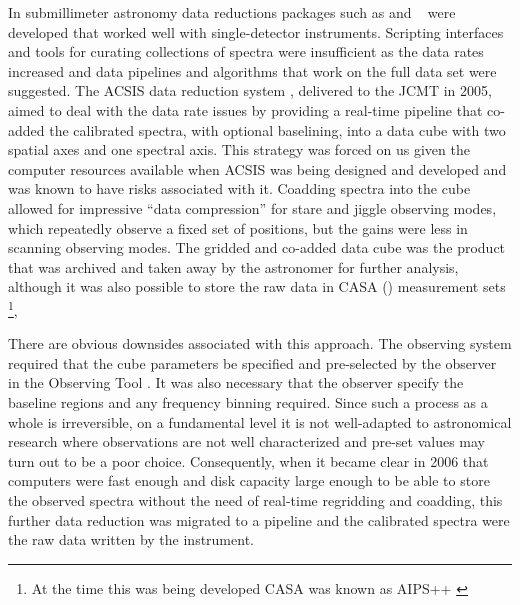 \documentclass[final,authoryear,5p,times,twocolumn]{elsarticle}
\begin{document}
In submillimeter astronomy data reductions packages such as
\citep[][]{2005sf2a.conf..721P} and
\specx\ \citep[][]{SPECX} were developed that worked well with
single-detector instruments. Scripting interfaces and tools for
curating collections of spectra were insufficient as the data rates
increased and data pipelines \citep[e.g.,][]{1995ASPC...75..117W} and
algorithms that work on the full data set
\citep[e.g.,][]{2002ASPC..278..329M} were suggested. The ACSIS data
reduction system \citep{2000ASPC..216..502L,2000SPIE.4015..114H},
delivered to the JCMT in 2005, aimed to deal with the data rate issues
by providing a real-time pipeline that co-added the calibrated
spectra, with optional baselining, into a data cube with two spatial axes and one spectral axis.  This strategy
was forced on us given the computer resources available when ACSIS was
being designed and developed and was known to have risks associated
with it. Coadding spectra into the cube allowed for impressive ``data
compression'' for stare and jiggle observing modes, which repeatedly
observe a fixed set of positions, but the gains were less in scanning
observing modes.
The gridded and co-added data cube was the product that was archived
and taken away by the astronomer for further analysis, although it was
also possible to store the raw data in CASA () measurement sets
\citep{2012ASPC..461..849P}\footnote{At the time this was being
developed CASA was known as AIPS++ \citep{2004ASPC..314..468M}},

There are obvious downsides associated with this approach. The
observing system required that the cube parameters be specified and
pre-selected by the observer in the Observing Tool
\citep{2002ASPC..281..453F}. It was also
necessary that the observer specify the baseline regions and any
frequency binning required. Since such a process as a whole is
irreversible, on a fundamental level it is not well-adapted to
astronomical research where observations are not well characterized
and pre-set values may turn out to be a poor choice.  Consequently,
when it became clear in 2006 that computers were fast enough and disk capacity
large enough to be able to store the observed spectra without the need
of real-time regridding and coadding, this further data reduction was
migrated to a pipeline and the calibrated spectra were the raw data
written by the instrument.
\end{document}
